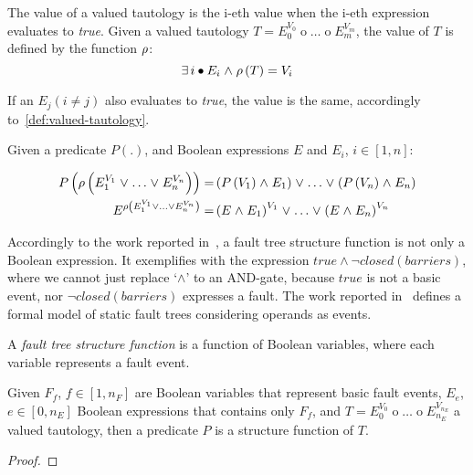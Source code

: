 \begin{definition}
\label{def:vtvalue}
The value of a valued tautology is the i-eth value when the i-eth expression evaluates to \emph{true}.
%
Given a valued tautology $T = E_0^{V_0} \mathop{op_0} \ldots \mathop{op_m} E_m^{V_m}$, the value of $T$ is defined by the function $\rho$:
\[
\exists i \bullet E_i \land \VTValue\left(T\right) = V_i  
\]
\end{definition}
If an $E_j (i\neq j)$ also evaluates to \emph{true}, the value is the same, accordingly to~\cref{def:valued-tautology}.

\begin{definition}
\label{def:vtvalue-rules}
Given a predicate $P\left(.\right)$, and Boolean expressions $E$ and $E_i$, $i \in [1,n]$:

\begin{align}
P\left(\rho\left(E_1^{V_1} \mathrel{\vee} \ldots \mathrel{\vee} E_n^{V_n}\right)\right) =& 
  \left( P\left(V_1\right) \mathrel{\wedge} E_1 \right) \mathrel{\vee} \ldots \mathrel{\vee}
  \left( P\left(V_n\right) \mathrel{\wedge} E_n \right)
  \\
E^{\rho\left(E_1^{V_1} \mathrel{\vee} \ldots \mathrel{\vee} E_n^{V_n}\right)} =& \left(E \mathrel{\wedge} E_1\right)^{V_1} \mathrel{\vee} \ldots \mathrel{\vee} \left(E \mathrel{\wedge} E_n\right)^{V_n}
\end{align} 
\end{definition}


Accordingly to the work reported in~\cite{STR2002}, a fault tree structure function is not only a Boolean expression.
%
It exemplifies with the expression $true \land \lnot closed(barriers)$, where we cannot just replace `$\land$' to an $\mathrm{AND}$-gate, because $true$ is not a basic event, nor $\lnot closed(barriers)$ expresses a fault.
%
The work reported in~\cite{XY2010} defines a formal model of static fault trees considering operands as events. 

\begin{definition}
A \emph{fault tree structure function} is a function of Boolean variables, where each variable represents a fault event.
\end{definition}

\begin{theorem}
Given $F_f$, $f \in [1,n_F]$ are Boolean variables that represent basic fault events, $E_e$, $e \in [0,n_E]$ Boolean expressions that contains only $F_f$, and $T = E_0^{V_0} \mathop{op_0} \ldots \mathop{op_{n_E}} E_{n_E}^{V_{n_E}}$ a valued tautology, then a predicate $P$ is a structure function of $T$.
\end{theorem}
\begin{proof}

\end{proof}

